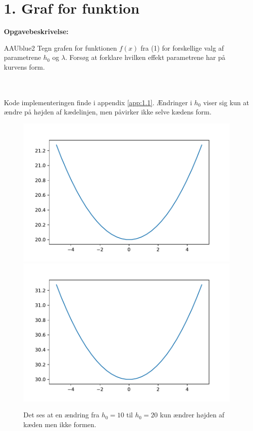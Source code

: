 \section*{1. Graf for funktion}
\textbf{Opgavebeskrivelse:}
\begin{color}{AAUblue2}
%
Tegn grafen for funktionen $f(x)$ fra (1) for forskellige valg af parametrene $h_0$ og $\lambda$.
Forsøg at forklare hvilken effekt parametrene har på kurvens form.
% 
\end{color}
\\\\
%
Kode implementeringen finde i appendix \ref{app:1.1}.
% 
Ændringer i $h_0$ viser sig kun at ændre på højden af kædelinjen, men påvirker ikke selve kædens form. 
%
\begin{figure}[h!]
\includegraphics[scale=0.5]{code/fig1}
\includegraphics[scale=0.5]{code/fig2}
\caption{Det ses at en ændring fra $h_0=10$ til $h_0=20$ kun ændrer højden af kæden men ikke formen.}
\end{figure}
